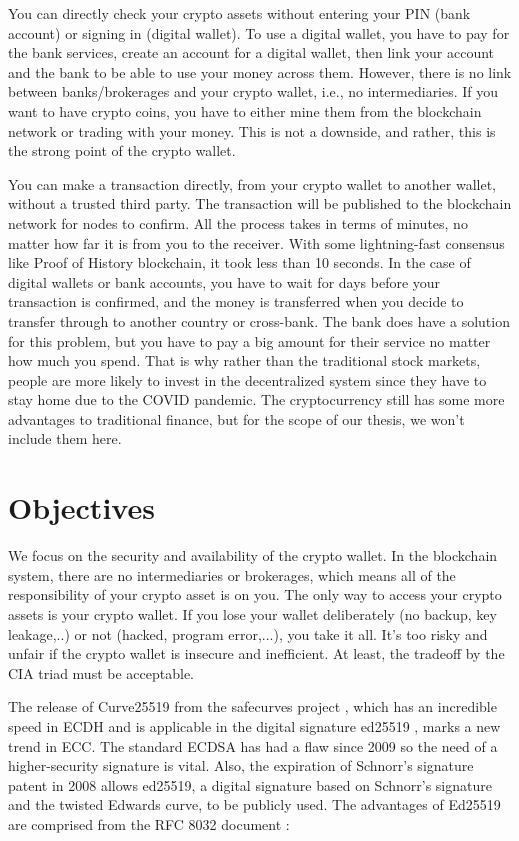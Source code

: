 You can directly check your crypto assets without entering your PIN (bank account) or signing in (digital wallet). To use a digital wallet, you have to pay for the bank services, create an account for a digital wallet, then link your account and the bank to be able to use your money across them. However, there is no link between banks/brokerages and your crypto wallet, i.e., no intermediaries. If you want to have crypto coins, you have to either mine them from the blockchain network or trading with your money. This is not a downside, and rather, this is the strong point of the crypto wallet.

You can make a transaction directly, from your crypto wallet to another wallet, without a trusted third party. The transaction will be published to the blockchain network for nodes to confirm. All the process takes in terms of minutes, no matter how far it is from you to the receiver. With some lightning-fast consensus like Proof of History blockchain, it took less than 10 seconds. In the case of digital wallets or bank accounts, you have to wait for days before your transaction is confirmed, and the money is transferred when you decide to transfer through to another country or cross-bank. The bank does have a solution for this problem, but you have to pay a big amount for their service no matter how much you spend. That is why rather than the traditional stock markets, people are more likely to invest in the decentralized system since they have to stay home due to the COVID pandemic. The cryptocurrency still has some more advantages to traditional finance, but for the scope of our thesis, we won’t include them here.

\section{Objectives}
\label{objectives}

We focus on the security and availability of the crypto wallet. In the blockchain system, there are no intermediaries or brokerages, which means all of the responsibility of your crypto asset is on you. The only way to access your crypto assets is your crypto wallet. If you lose your wallet deliberately (no backup, key leakage,..) or not (hacked, program error,...), you take it all. It’s too risky and unfair if the crypto wallet is insecure and inefficient. At least, the tradeoff by the CIA triad must be acceptable.

The release of Curve25519 from the safecurves project \cite{Bernstein2006}, which has an incredible speed in ECDH and is applicable in the digital signature ed25519 \cite{Bernstein2011}, marks a new trend in ECC. The standard ECDSA has had a flaw since 2009 \cite{Schmidt2009} so the need of a higher-security signature is vital. Also, the expiration of Schnorr’s signature patent in 2008 allows ed25519, a digital signature based on Schnorr’s signature and the twisted Edwards curve, to be publicly used. The advantages of Ed25519 are comprised from the RFC 8032 document \cite{Josefsson2017}:

